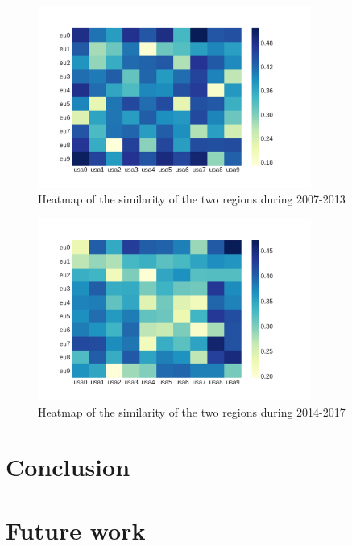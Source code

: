 \documentclass[12pt]{report}
\begin{document}
\begin{figure}
\centering
\includegraphics[width=0.8\textwidth, natwidth=1080,natheight=720]
{figs/heatmaps/heatmapFP7.png}
\caption{Heatmap of the similarity of the two regions during 2007-2013}
\end{figure}
\begin{figure}
\centering
\includegraphics[width=0.8\textwidth, natwidth=1080,natheight=720]
{figs/heatmaps/heatmapH2020.png}
\caption{Heatmap of the similarity of the two regions during 2014-2017}
\end{figure}

\section{Conclusion}

\section{Future work}

{}



\clearpage
\appendix
\end{document}
